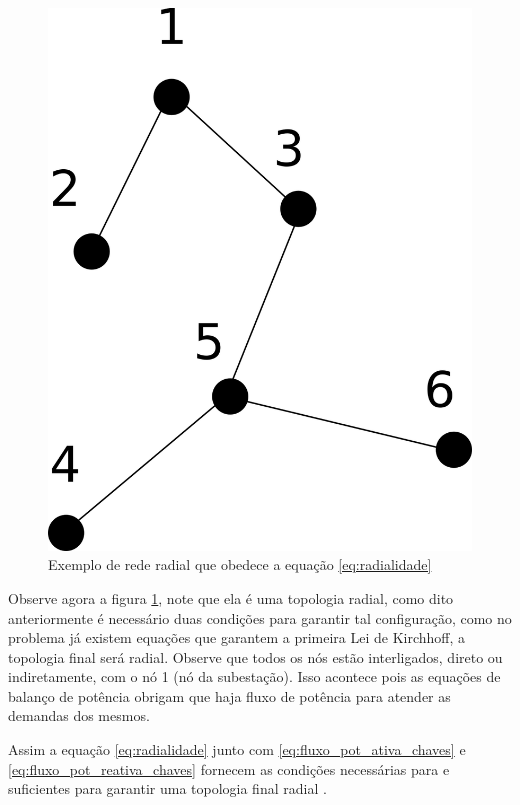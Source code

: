 \begin{figure}[H]
    \centering
    \includegraphics[scale =0.8]{01_img/restricao_radialidade.png}
    \caption{Exemplo de rede radial que obedece a equação \ref{eq:radialidade}}
    \label{fig:radialidade_right}
\end{figure}

Observe agora a figura \ref{fig:radialidade_right}, note que ela é uma topologia radial, como dito anteriormente é necessário duas condições para garantir tal configuração, como no problema já existem equações que garantem a primeira Lei de Kirchhoff, a topologia final será radial. 
Observe que todos os nós estão interligados, direto ou indiretamente, com o nó 1 (nó da subestação). 
Isso acontece pois as equações de balanço de potência obrigam que haja fluxo de potência para atender as demandas dos mesmos.

Assim a equação \ref{eq:radialidade} junto com \ref{eq:fluxo_pot_ativa_chaves} e \ref{eq:fluxo_pot_reativa_chaves} fornecem as condições necessárias para e suficientes para garantir uma topologia final radial \cite{Lavorato2012ImposingProblems}.

